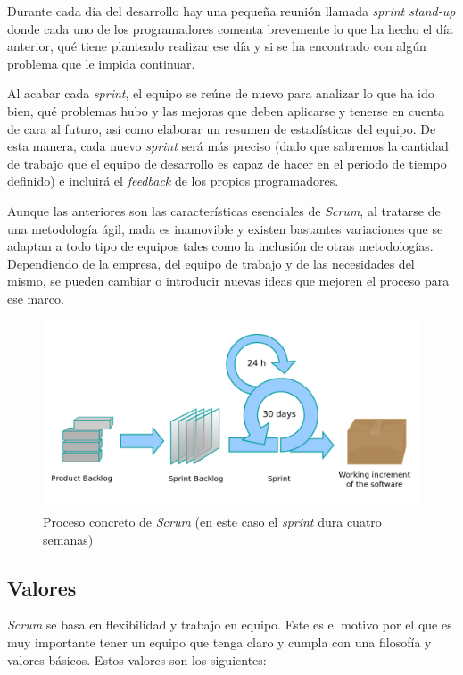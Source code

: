 Durante cada día del desarrollo hay una pequeña reunión llamada \textit{sprint stand-up} donde cada uno de los programadores comenta brevemente lo que ha hecho el día anterior, qué tiene planteado realizar ese día y si se ha encontrado con algún problema que le impida continuar.

Al acabar cada \textit{sprint}, el equipo se reúne de nuevo para analizar lo que ha ido bien, qué problemas hubo y las mejoras que deben aplicarse y tenerse en cuenta de cara al futuro, así como elaborar un resumen de estadísticas del equipo. De esta manera, cada nuevo \textit{sprint} será más preciso (dado que sabremos la cantidad de trabajo que el equipo de desarrollo es capaz de hacer en el periodo de tiempo definido) e incluirá el \textit{feedback} de los propios programadores.

Aunque las anteriores son las características esenciales de \textit{Scrum}, al tratarse de una metodología ágil, nada es inamovible y existen bastantes variaciones que se adaptan a todo tipo de equipos tales como la inclusión de otras metodologías. Dependiendo de la empresa, del equipo de trabajo y de las necesidades del mismo, se pueden cambiar o introducir nuevas ideas que mejoren el proceso para ese marco.

\begin{figure}[H]
		\includegraphics[width=\textwidth,height=\textheight,keepaspectratio]{./img/scrumprocess.png}
	\caption{Proceso concreto de \textit{Scrum} (en este caso el \textit{sprint} dura cuatro semanas)}
	\label{fig:scrumproceso}
\end{figure}

\subsection{Valores}

\textit{Scrum} se basa en flexibilidad y trabajo en equipo. Este es el motivo por el que es muy importante tener un equipo que tenga claro y cumpla con una filosofía y valores básicos. Estos valores son los siguientes:

